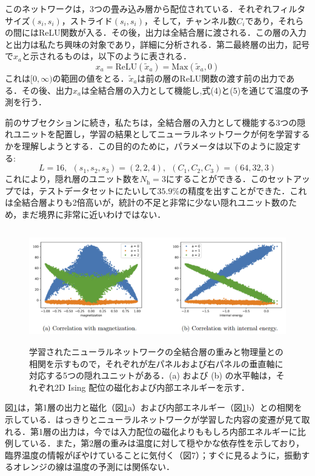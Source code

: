 \documentclass[a4paper,11pt]{jsarticle}
\begin{document}
このネットワークは，3つの畳み込み層から配位されている．それぞれフィルタサイズ$(s_i,s_i)$，ストライド$(s_i,s_i)$，そして，チャンネル数$C_i$であり，それらの間にはReLU関数が入る．その後，出力は全結合層に渡される．この層の入力と出力は私たち興味の対象であり，詳細に分析される．第二最終層の出力，記号で$x_a$と示されるものは，以下のように表される．
\begin{equation}
  x_a = \text{ReLU}(\tilde{x}_a) = \text{Max}(\tilde{x}_a,0)
\end{equation}
これは$[0,\infty)$の範囲の値をとる．$\tilde{x}_a$は前の層のReLU関数の渡す前の出力である．その後、出力$x_a$は全結合層の入力として機能し,式(4)と(5)を通じて温度の予測を行う．\par
前のサブセクションに続き，私たちは，全結合層の入力として機能する3つの隠れユニットを配置し，学習の結果としてニューラルネットワークが何を学習するかを理解しようとする．この目的のために，パラメータは以下のように設定する:
\begin{equation}
  L = 16, \ \ (s_1, s_2, s_3) = (2, 2, 4), \ \ (C_1, C_2, C_3) = (64, 32, 3)
\end{equation}
これにより，隠れ層のユニット数を$N_{\text{h}}=3$にすることができる．このセットアップでは，テストデータセットにたいして$35.9\%$の精度を出すことができた．これは全結合層よりも2倍高いが，統計の不足と非常に少ない隠れユニット数のため，まだ境界に非常に近いわけではない．\par
\begin{figure}[ht]
  \begin{center}
    \includegraphics[height=5cm]{image/Figure5.png}
    \caption{学習されたニューラルネットワークの全結合層の重みと物理量との相関を示すもので，それぞれが左パネルおよび右パネルの垂直軸に対応する5つの隠れユニットがある．(a) および (b) の水平軸は，それぞれ2D Ising 配位の磁化および内部エネルギーを示す．\label{correlation}}
  \end{center}
\end{figure}
図\ref{correlation}は，第1層の出力と磁化（図\ref{correlation}a）および内部エネルギー（図\ref{correlation}b）との相関を示している．はっきりとニューラルネットワークが学習した内容の変遷が見て取れる．第1層の出力は，今では入力配位の磁化よりももしろ内部エネルギーに比例している．また，第2層の重みは温度に対して穏やかな依存性を示しており，臨界温度の情報がぼやけていることに気付く（図7）；すぐに見るように，振動するオレンジの線は温度の予測には関係ない．\par
\end{document}
